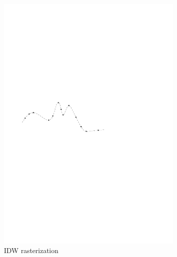 \begin{figure}
\begin{subfigure}[b]{0.3\linewidth}
    \includegraphics[width=\textwidth,page=4]{figs/1Didw.pdf}
    \caption{IDW rasterization}\label{fig:fr:idw:a}
  \end{subfigure}
  \qquad
  \quad
  \begin{subfigure}[b]{0.3\linewidth}
    \centering

\end{subfigure}
\end{figure}
